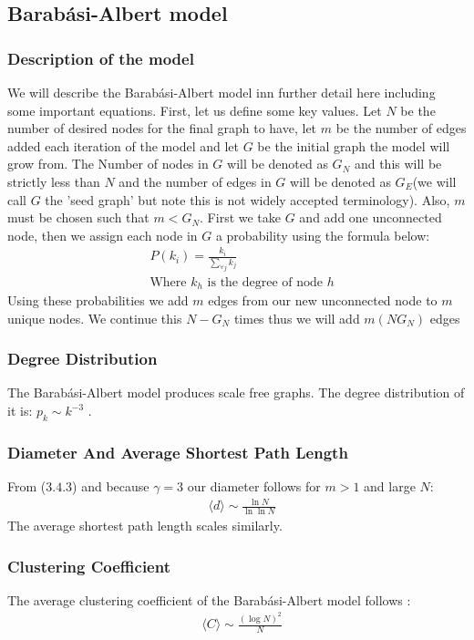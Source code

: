 \documentclass{article}
\begin{document}
        \subsection{Barabási-Albert model}
            \subsubsection{Description of the model}
            We will describe the Barabási-Albert model inn further detail here including some important equations. First, let us define some key values. Let $N$ be the number of desired nodes for the final graph to have, let $m$ be the number of edges added each iteration of the model and let $G$ be the initial graph the model will grow from. The Number of nodes in $G$ will be denoted as $G_N$ and this will be strictly less than $N$ and the number of edges in $G$ will be denoted as $G_E$(we will call $G$ the 'seed graph' but note this is not widely accepted terminology). Also, $m$ must be chosen such that $m < G_N$. First we take $G$ and add one unconnected node, then we assign each node in $G$ a probability using the formula below:
            \begin{align*}
                &P(k_i)=\frac{k_i}{\sum_{\forall j}k_j}\\
                &\text{Where $k_h$ is the degree of node $h$}
            \end{align*}
            Using these probabilities we add $m$ edges from our new unconnected node to $m$ unique nodes. We continue this $N-G_N$ times thus we will add $m(NG_{N})$ edges
            \subsubsection{Degree Distribution}
            The Barabási-Albert model produces scale free graphs. The degree distribution of it is: $p_{k} \sim k^{-3}$ \parencite{barabasi2013network}.
            \subsubsection{Diameter And Average Shortest Path Length}
            From ($3.4.3$) and because $\gamma = 3$ our diameter follows for $m>1$ and large $N$:
            \begin{align*}
                &\langle d \rangle \sim \frac{\ln N}{\ln \ln N}
            \end{align*}
            The average shortest path length scales similarly.
            \subsubsection{Clustering Coefficient}
            The average clustering coefficient of the Barabási-Albert model follows \parencite{barabasi2013network}\parencite{klemm2002growing}:
            \begin{align*}
                &\langle C \rangle \sim \frac{(\log N)^2}{N}
            \end{align*}
\end{document}
